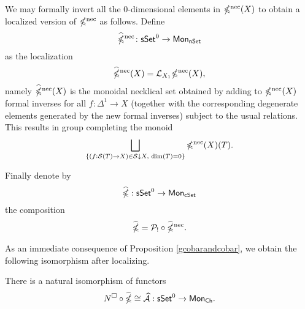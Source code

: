 We may formally invert all the $0$-dimensional elements in $\mathbb{\Omega}^{\text{nec}}(X)$ to obtain a localized version of $\mathbb{\Omega}^{\text{nec}}$ as follows. Define 
$$\widehat{\mathbb{\Omega}}^{\text{nec}} \colon \mathsf{sSet}^0 \to \mathsf{Mon}_{\mathsf{nSet}}$$
as the localization
$$\widehat{\mathbb{\Omega}}^{\text{nec}}(X)= \mathcal{L}_{X_1}\mathbb{\Omega}^{\text{nec}}(X),$$
namely $\widehat{\mathbb{\Omega}}^{\text{nec}}(X)$ is the monoidal necklical set obtained by adding to $\mathbb{\Omega}^{\text{nec}}(X)$  formal inverses for all $f\colon \Delta^1 \to X$ (together with the corresponding degenerate elements generated by the new formal inverses) subject to the usual relations. This results in group completing the monoid
$$\bigsqcup_{\{(f: \mathcal{S}(T)\to X )\in \mathcal{S} \downarrow X, \text{ dim}(T)=0\}} \mathbb{\Omega}^{\text{nec}}(X)(T).$$

Finally denote by $$\widehat{\mathbb{\Omega}}: \mathsf{sSet}^0 \to \mathsf{Mon}_{\mathsf{cSet}}$$ the composition $$\widehat{\mathbb{\Omega}}= \mathcal{P}_{!} \circ \widehat{\mathbb{\Omega}}^{\text{nec}}.$$ 

As an immediate consequence of Proposition \ref{gcobarandcobar}, we obtain the following isomorphism after localizing.

\begin{corollary}\label{localizedcobar}
There is a natural isomorphism of functors
$$N^{\square} \circ \widehat{\mathbb{\Omega}} \cong \widehat{\mathcal{A}} :\mathsf{sSet}^0 \to \mathsf{Mon}_{\mathsf{Ch}}.$$ 
\end{corollary}


